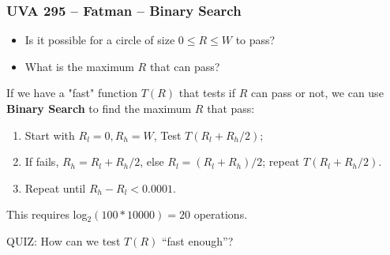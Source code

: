 \begin{frame}
  \frametitle{UVA 295 -- Fatman -- Binary Search}

    \begin{block}{}
      \begin{itemize}
      \item Is it possible for a circle of size $0 \leq R \leq W$ to pass?
      \item What is the maximum $R$ that can pass?
      \end{itemize}
    \end{block}

    If we have a "fast" function $T(R)$ that tests if $R$ can pass or not, we can use {\bf Binary Search} to find the maximum $R$ that pass:

    \bigskip

    \begin{enumerate}
    \item Start with $R_l = 0, R_h = W$, Test $T(R_l+R_h /2)$;
    \item If fails, $R_h = R_l+R_h/2$, else $R_l = (R_l+R_h)/2$; repeat $T(R_l+R_h/2)$.
    \item Repeat until $R_h - R_l < 0.0001$.
    \end{enumerate}

    This requires log$_2(100*10000) = 20$ operations.

    \bigskip

    \alert{QUIZ:} How can we test $T(R)$ ``fast enough''?
\end{frame}

